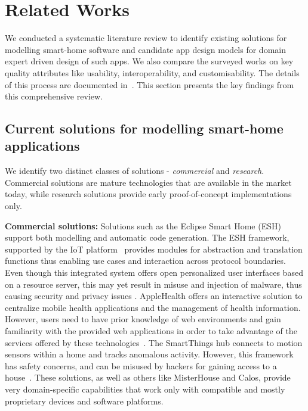\section{Related Works}
\label{sec:relatedworks}

We conducted a systematic literature review to identify existing solutions for modelling smart-home software and candidate app design models for domain expert driven design of such apps. We also compare the surveyed works on key quality attributes like usability, interoperability, and customisability.
The details of this process are documented in~\cite{perera2018thesis}. This section presents the key findings from this comprehensive review.

\subsection{Current solutions for modelling smart-home applications}

We identify two distinct classes of solutions - \textit{commercial} and \textit{research}. Commercial solutions are mature technologies that are available in the market today, while research solutions provide early proof-of-concept implementations only.

\noindent\textbf{Commercial solutions:} 
Solutions such as the Eclipse Smart Home (ESH) support both modelling and automatic code generation. 
The ESH framework, supported by the IoT platform~\cite{Smirek} provides modules for abstraction and translation functions thus enabling use cases and interaction across protocol boundaries. Even though this integrated system offers open personalized user interfaces based on a resource server, this may yet result in misuse and injection of malware, thus causing security and privacy issues \cite{Smirek}. 
AppleHealth offers an interactive solution to centralize mobile health applications and the management of health information. However, users need to have prior knowledge of web environments and gain familiarity with the provided web applications in order to take advantage of the services offered by these technologies~\cite{Vega-Barbas}. 
The SmartThings hub connects to motion sensors within a home and tracks anomalous activity. 
However, this framework has safety concerns, and can be misused by hackers for gaining access to a house~\cite{zillner2015white}. These solutions, as well as others like MisterHouse and Calos, provide very domain-specific capabilities that work only with compatible and mostly proprietary devices and software platforms.

